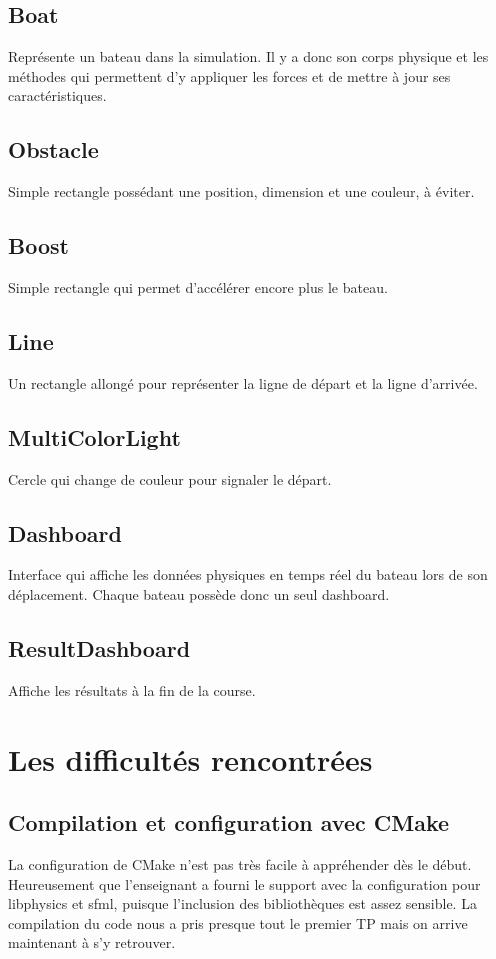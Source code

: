 \documentclass[a4paper,margin=1cm,11pt]{report}
\begin{document}
\section{Boat}
Représente un bateau dans la simulation. Il y a donc son corps physique et les méthodes qui permettent d’y appliquer les forces et de mettre à jour ses caractéristiques.

\section{Obstacle}
Simple rectangle possédant une position, dimension et une couleur, à éviter.

\section{Boost}
Simple rectangle qui permet d’accélérer encore plus le bateau.

\section{Line}
Un rectangle allongé pour représenter la ligne de départ et la ligne d’arrivée.

\section{MultiColorLight}
Cercle qui change de couleur pour signaler le départ.

\section{Dashboard}
Interface qui affiche les données physiques en temps réel du bateau lors de son déplacement. Chaque bateau possède donc un seul dashboard.

\section{ResultDashboard}
Affiche les résultats à la fin de la course.

\chapter{Les difficultés rencontrées}

\section{Compilation et configuration avec CMake}
La configuration de CMake n’est pas très facile à appréhender dès le début. Heureusement que l’enseignant a fourni le support avec la configuration pour libphysics et sfml, puisque l’inclusion des bibliothèques est assez sensible. 
La compilation du code nous a pris presque tout le premier TP mais on arrive maintenant à s’y retrouver.
\end{document}

